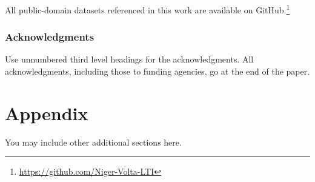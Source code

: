 \documentclass{article} %
\begin{document}
All public-domain datasets referenced in this work are available on GitHub.\footnote{\url{https://github.com/Niger-Volta-LTI}}

\subsubsection*{Acknowledgments}
Use unnumbered third level headings for the acknowledgments. All
acknowledgments, including those to funding agencies, go at the end of the paper.




\appendix
\section{Appendix}
You may include other additional sections here. 
\end{document}
